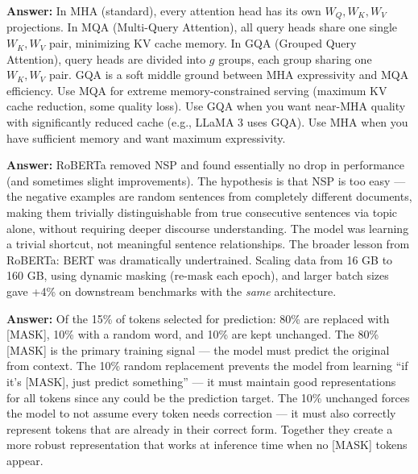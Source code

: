 \documentclass[11pt, a4paper]{article}
\begin{document}
\begin{notebox}
\textbf{Answer:} In MHA (standard), every attention head has its own $W_Q, W_K, W_V$ projections. In MQA (Multi-Query Attention), all query heads share one single $W_K, W_V$ pair, minimizing KV cache memory. In GQA (Grouped Query Attention), query heads are divided into $g$ groups, each group sharing one $W_K, W_V$ pair. GQA is a soft middle ground between MHA expressivity and MQA efficiency. Use MQA for extreme memory-constrained serving (maximum KV cache reduction, some quality loss). Use GQA when you want near-MHA quality with significantly reduced cache (e.g., LLaMA 3 uses GQA). Use MHA when you have sufficient memory and want maximum expressivity.
\end{notebox}

\begin{notebox}
\textbf{Answer:} RoBERTa removed NSP and found essentially no drop in performance (and sometimes slight improvements). The hypothesis is that NSP is too easy --- the negative examples are random sentences from completely different documents, making them trivially distinguishable from true consecutive sentences via topic alone, without requiring deeper discourse understanding. The model was learning a trivial shortcut, not meaningful sentence relationships. The broader lesson from RoBERTa: BERT was dramatically undertrained. Scaling data from 16 GB to 160 GB, using dynamic masking (re-mask each epoch), and larger batch sizes gave +4\% on downstream benchmarks with the \emph{same} architecture.
\end{notebox}

\begin{notebox}
\textbf{Answer:} Of the 15\% of tokens selected for prediction: 80\% are replaced with [MASK], 10\% with a random word, and 10\% are kept unchanged. The 80\% [MASK] is the primary training signal --- the model must predict the original from context. The 10\% random replacement prevents the model from learning ``if it's [MASK], just predict something'' --- it must maintain good representations for all tokens since any could be the prediction target. The 10\% unchanged forces the model to not assume every token needs correction --- it must also correctly represent tokens that are already in their correct form. Together they create a more robust representation that works at inference time when no [MASK] tokens appear.
\end{notebox}
\end{document}
